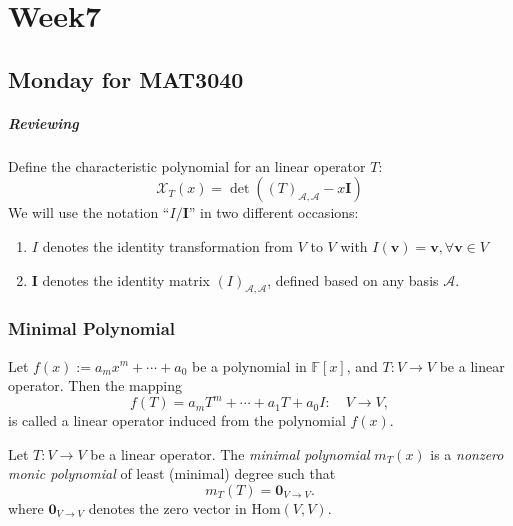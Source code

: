 \chapter{Week7}
\section{Monday for MAT3040}
\paragraph{Reviewing}
Define the characteristic polynomial for an linear operator $T$:
\[
\mathcal{X}_T(x)= \det((T)_{\mathcal{A},\mathcal{A}} - x\bm I)
\]
We will use the notation ``$I/\bm I$'' in two different occasions:
\begin{enumerate}
\item
$I$ denotes the identity transformation from $V$ to $V$ with $I(\bm v)=\bm v,\forall\bm v\in V$
\item
$\bm I$ denotes the identity matrix $(I)_{\mathcal{A},\mathcal{A}}$, defined based on any basis $\mathcal{A}$.
\end{enumerate}

\subsection{Minimal Polynomial}
\begin{definition}
Let $f(x):=a_mx^m+\cdots+a_0$ be a polynomial in $\mathbb{F}[x]$, and $T:V\to V$ be a linear operator.
Then the mapping
\[
f(T)=a_mT^m+\cdots+a_1T+a_0I:\quad
V\to V,
\]
is called a linear operator induced from the polynomial $f(x)$.
\end{definition}

\begin{definition}
Let $T:V\to V$ be a linear operator.
The \emph{minimal polynomial} $m_T(x)$ is a \emph{nonzero monic polynomial} 
of least (minimal) degree such that 
\[
m_T(T)=\bm0_{V\to V}.
\]
where $\bm0_{V\to V}$ denotes the zero vector in $\text{Hom}(V,V)$.
\end{definition}

